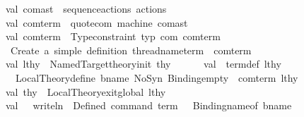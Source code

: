 \begin{isabellebody}
\ \ \ \ \ \ val\ com{\isacharunderscore}{\kern0pt}ast\ {\isacharequal}{\kern0pt}\ sequence{\isacharunderscore}{\kern0pt}actions\ actions\isanewline
\ \ \ \ \ \ val\ com{\isacharunderscore}{\kern0pt}term\ {\isacharequal}{\kern0pt}\ quote{\isacharunderscore}{\kern0pt}com\ machine\ com{\isacharunderscore}{\kern0pt}ast\isanewline
\ \ \ \ \ \ val\ com{\isacharunderscore}{\kern0pt}term\ {\isacharequal}{\kern0pt}\ Type{\isachardot}{\kern0pt}constraint\ {\isacharat}{\kern0pt}{\isacharbraceleft}{\kern0pt}typ\ com{\isacharbraceright}{\kern0pt}\ com{\isacharunderscore}{\kern0pt}term\isanewline
\ \ \isanewline
\ \ \ \ \ \ {\isacharparenleft}{\kern0pt}{\isacharasterisk}{\kern0pt}\ Create\ a\ simple\ definition{\isacharcolon}{\kern0pt}\ thread{\isacharunderscore}{\kern0pt}name{\isacharunderscore}{\kern0pt}term\ {\isacharequal}{\kern0pt}\ com{\isacharunderscore}{\kern0pt}term\ {\isacharasterisk}{\kern0pt}{\isacharparenright}{\kern0pt}\isanewline
\ \ \ \ \ \ val\ lthy\ {\isacharequal}{\kern0pt}\ Named{\isacharunderscore}{\kern0pt}Target{\isachardot}{\kern0pt}theory{\isacharunderscore}{\kern0pt}init\ thy{\isacharprime}{\kern0pt}\isanewline
\ \ \ \ \ \ val\ {\isacharparenleft}{\kern0pt}{\isacharparenleft}{\kern0pt}{\isacharunderscore}{\kern0pt}{\isacharcomma}{\kern0pt}\ term{\isacharunderscore}{\kern0pt}def{\isacharparenright}{\kern0pt}{\isacharcomma}{\kern0pt}\ lthy{\isacharprime}{\kern0pt}{\isacharparenright}{\kern0pt}\ {\isacharequal}{\kern0pt}\isanewline
\ \ \ \ \ \ \ \ Local{\isacharunderscore}{\kern0pt}Theory{\isachardot}{\kern0pt}define\ {\isacharparenleft}{\kern0pt}{\isacharparenleft}{\kern0pt}bname{\isacharcomma}{\kern0pt}\ NoSyn{\isacharparenright}{\kern0pt}{\isacharcomma}{\kern0pt}\ {\isacharparenleft}{\kern0pt}{\isacharparenleft}{\kern0pt}Binding{\isachardot}{\kern0pt}empty{\isacharcomma}{\kern0pt}\ {\isacharbrackleft}{\kern0pt}{\isacharbrackright}{\kern0pt}{\isacharparenright}{\kern0pt}{\isacharcomma}{\kern0pt}\ com{\isacharunderscore}{\kern0pt}term{\isacharparenright}{\kern0pt}{\isacharparenright}{\kern0pt}\ lthy\isanewline
\ \ \ \ \ \ val\ thy{\isacharprime}{\kern0pt}{\isacharprime}{\kern0pt}\ {\isacharequal}{\kern0pt}\ Local{\isacharunderscore}{\kern0pt}Theory{\isachardot}{\kern0pt}exit{\isacharunderscore}{\kern0pt}global\ lthy{\isacharprime}{\kern0pt}\isanewline
\ \ \ \ \ \ \isanewline
\ \ \ \ \ \ val\ {\isacharunderscore}{\kern0pt}\ {\isacharequal}{\kern0pt}\ writeln\ {\isacharparenleft}{\kern0pt}{\isachardoublequote}{\kern0pt}{\isasymcheckmark}\ Defined\ command\ term{\isacharcolon}{\kern0pt}\ {\isachardoublequote}{\kern0pt}\ {\isacharcircum}{\kern0pt}\ Binding{\isachardot}{\kern0pt}name{\isacharunderscore}{\kern0pt}of\ bname{\isacharparenright}{\kern0pt}\isanewline

\end{isabellebody}
